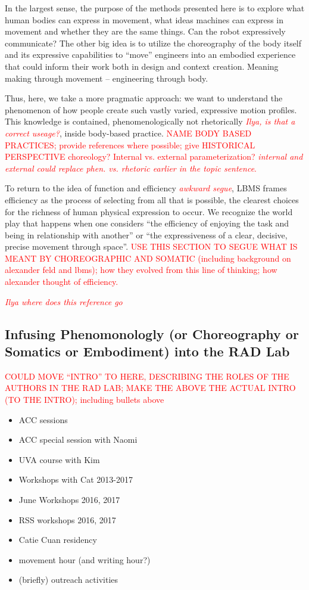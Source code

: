 \documentclass[arts,article,submit,moreauthors,pdftex,10pt,a4paper]{mdpi}
\begin{document}
In the largest sense, the purpose of the methods presented here is to explore what human bodies can express in movement, what ideas machines can express in movement and whether they are the same things. Can the robot expressively communicate? The other big idea is to utilize the choreography of the body itself and its expressive capabilities to ``move''  engineers into an embodied experience that could inform their work both in design and context creation. Meaning making through movement -- engineering through body.

Thus, here, we take a more pragmatic approach: we want to understand the phenomenon of how people create such vastly varied, expressive motion profiles.  This knowledge is contained, phenomenologically not rhetorically \textcolor{red}{\textit{Ilya, is that a correct useage?}}, inside body-based practice.  \textcolor{red}{NAME BODY BASED PRACTICES; provide references where possible; give HISTORICAL PERSPECTIVE choreology?  Internal vs. external parameterization? \textit{internal and external could replace phen. vs. rhetoric earlier in the topic sentence}.}

To return to the idea of function and efficiency \textcolor{red}{\textit{awkward segue}}, LBMS frames efficiency as the process of selecting from all that is possible, the clearest choices for the richness of human physical expression to occur. We recognize the world play that happens when one considers ``the efficiency of enjoying the task and being in relationship with another'' or ``the expressiveness of a clear, decisive, precise movement through space''.  \textcolor{red}{USE THIS SECTION TO SEGUE WHAT IS MEANT BY CHOREOGRAPHIC AND SOMATIC (including background on alexander feld and lbms); how they evolved from this line of thinking; how alexander thought of efficiency.}

\textcolor{red}{\textit{Ilya where does this reference go \cite{hawhee2004bodily}}}

\subsection{Infusing Phenomonologly (or Choreography or Somatics or Embodiment) into the RAD Lab}

\textcolor{red}{COULD MOVE ``INTRO'' TO HERE, DESCRIBING THE ROLES OF THE AUTHORS IN THE RAD LAB; MAKE THE ABOVE THE ACTUAL INTRO (TO THE INTRO); including bullets above}

\begin{itemize}
\item ACC sessions
\item ACC special session with Naomi
\item UVA course with Kim
\item Workshops with Cat 2013-2017
\item June Workshops 2016, 2017
\item RSS workshops 2016, 2017
\item Catie Cuan residency
\item movement hour (and writing hour?)
\item (briefly) outreach activities
\end{itemize}
\end{document}
